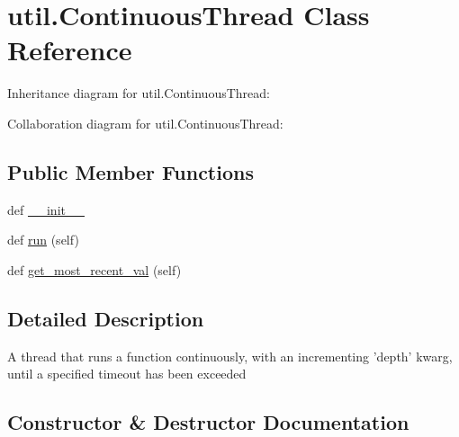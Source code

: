 \hypertarget{classutil_1_1_continuous_thread}{}\section{util.\+Continuous\+Thread Class Reference}
\label{classutil_1_1_continuous_thread}


Inheritance diagram for util.\+Continuous\+Thread\+:


Collaboration diagram for util.\+Continuous\+Thread\+:
\subsection*{Public Member Functions}
\begin{DoxyCompactItemize}
\item 
def \hyperlink{classutil_1_1_continuous_thread_a16e1f77f2d184cab1df58acec3d0dfaa}{\+\_\+\+\_\+init\+\_\+\+\_\+}
\item 
def \hyperlink{classutil_1_1_continuous_thread_a682cdd72375f821f9f98969f4e3e4162}{run} (self)
\item 
def \hyperlink{classutil_1_1_continuous_thread_a8a3a5d08728b65941d3eeb9c20388239}{get\+\_\+most\+\_\+recent\+\_\+val} (self)
\end{DoxyCompactItemize}


\subsection{Detailed Description}
\begin{DoxyVerb}A thread that runs a function continuously,
with an incrementing 'depth' kwarg, until
a specified timeout has been exceeded
\end{DoxyVerb}
 

\subsection{Constructor \& Destructor Documentation}
\hypertarget{classutil_1_1_continuous_thread_a16e1f77f2d184cab1df58acec3d0dfaa}{}
